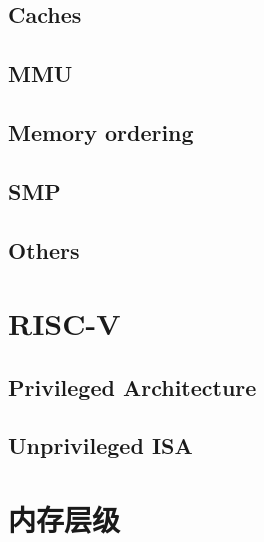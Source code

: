 
%
%
%

\subsection{Caches}

\subsection{MMU}

\subsection{Memory ordering} \label{sec:memory-ordering}

\subsection{SMP}

\subsection{Others}

\section{RISC-V}

\subsection{Privileged Architecture}

\subsection{Unprivileged ISA}

\section{内存层级}

